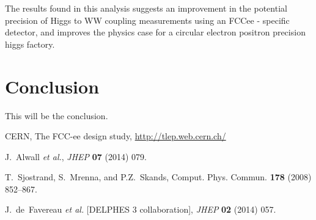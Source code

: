 \documentclass[preprintnumbers,nofootinbib,noshowpacs,eqsecnum,prd,superscriptaddress,letterpaper]{revtex4}
\begin{document}
The results found in this analysis suggests an improvement in the potential precision of Higgs to WW coupling measurements using an FCCee - specific detector, and improves the physics case for a circular electron positron precision higgs factory. 

\section{Conclusion}
\label{sec:conclusion}


This will be the conclusion.

\clearpage

\begin{thebibliography}{99}

   CERN, The FCC-ee design study, \url{http://tlep.web.cern.ch/}
  
   J.~Alwall {\it et al.},
   {\it JHEP} {\bf 07} (2014) 079.
  
   T.~Sjostrand, S.~Mrenna, and P.Z.~Skands,
   Comput. Phys. Commun. {\bf 178} (2008) 852–867.
 
   J.~de~Favereau {\it et al.} [DELPHES 3 collaboration],
   {\it JHEP} {\bf 02} (2014) 057.
  

\end{thebibliography}
\end{document}
